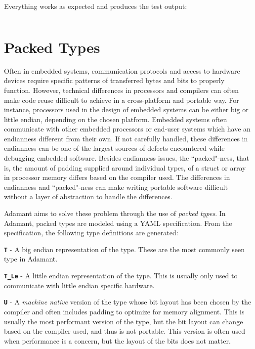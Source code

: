 Everything works as expected and produces the test output:

\vspace{5mm} %
\inputminted{text}{ ../example_architecture/oo_package/test/output.txt}
\vspace{5mm} %

\newpage
\section{Packed Types} \label{Packed Types}

Often in embedded systems, communication protocols and access to hardware devices require specific patterns of transferred bytes and bits to properly function. However, technical differences in processors and compilers can often make code reuse difficult to achieve in a cross-platform and portable way. For instance, processors used in the design of embedded systems can be either big or little endian, depending on the chosen platform. Embedded systems often communicate with other embedded processors or end-user systems which have an endianness different from their own. If not carefully handled, these differences in endianness can be one of the largest sources of defects encountered while debugging embedded software. Besides endianness issues, the ``packed"-ness, that is, the amount of padding supplied around individual types, of a struct or array in processor memory differs based on the compiler used. The differences in endianness and ``packed"-ness can make writing portable software difficult without a layer of abstraction to handle the differences.

Adamant aims to solve these problem through the use of \textit{packed types}.  In Adamant, packed types are modeled using a YAML specification. From the specification, the following type definitions are generated:

\begin{spaceditemize}
  \item \textbf{\texttt{T}} - A big endian representation of the type. These are the most commonly seen type in Adamant.
  \item \textbf{\texttt{T\_Le}} - A little endian representation of the type. This is usually only used to communicate with little endian specific hardware.
  \item \textbf{\texttt{U}} - A \textit{machine native} version of the type whose bit layout has been chosen by the compiler and often includes padding to optimize for memory alignment. This is usually the most performant version of the type, but the bit layout can change based on the compiler used, and thus is not portable. This version is often used when performance is a concern, but the layout of the bits does not matter.
\end{spaceditemize}

